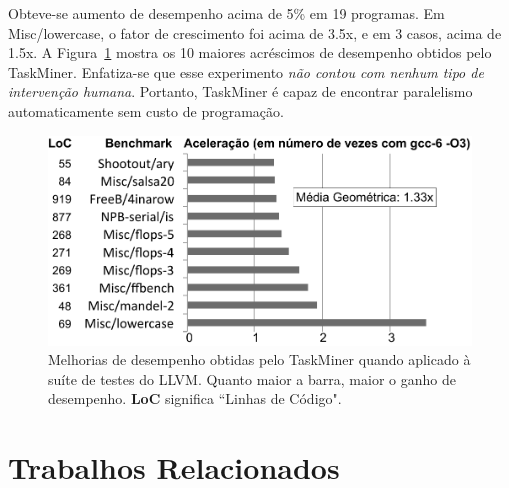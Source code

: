 \documentclass[sigplan,10pt,review]{acmart}
\newcommand\Taskminer{\mbox{\textsf{TaskMiner}}}
\begin{document}
Obteve-se aumento de desempenho acima de 5\% em 19 programas. 
Em \textsf{Misc/lowercase}, o fator de crescimento foi acima de 3.5x, e em 3 casos, acima de 1.5x.
A Figura~\ref{fig:TM_GeneralProgs} mostra os 10 maiores acréscimos de desempenho obtidos pelo \Taskminer{}.
Enfatiza-se que esse experimento {\em não contou com nenhum tipo de intervenção humana}.
Portanto, \Taskminer{} é capaz de encontrar paralelismo automaticamente sem custo de programação.

\begin{figure}[t!]
\begin{center}
\includegraphics[width=1\columnwidth]{images/TM_GeneralProgs}
\caption{Melhorias de desempenho obtidas pelo \Taskminer{} quando aplicado à suíte de testes
do LLVM. Quanto maior a barra, maior o ganho de desempenho.
\textbf{LoC} significa ``Linhas de Código".}
\label{fig:TM_GeneralProgs}
\end{center}
\end{figure}




\section{Trabalhos Relacionados}
\label{sec:rw}
\end{document}
